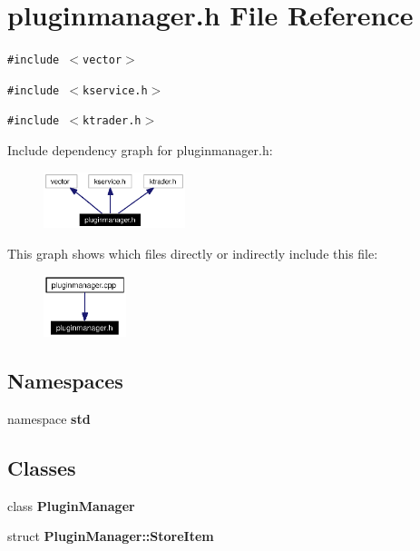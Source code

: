 \section{pluginmanager.h File Reference}
\label{pluginmanager_8h}


{\tt \#include $<$vector$>$}\par
{\tt \#include $<$kservice.h$>$}\par
{\tt \#include $<$ktrader.h$>$}\par


Include dependency graph for pluginmanager.h:\begin{figure}[H]
\begin{center}
\leavevmode
\includegraphics[width=117pt]{pluginmanager_8h__incl}
\end{center}
\end{figure}


This graph shows which files directly or indirectly include this file:\begin{figure}[H]
\begin{center}
\leavevmode
\includegraphics[width=68pt]{pluginmanager_8h__dep__incl}
\end{center}
\end{figure}
\subsection*{Namespaces}
\begin{CompactItemize}
\item 
namespace {\bf std}
\end{CompactItemize}
\subsection*{Classes}
\begin{CompactItemize}
\item 
class {\bf Plugin\-Manager}
\item 
struct {\bf Plugin\-Manager::Store\-Item}
\end{CompactItemize}
